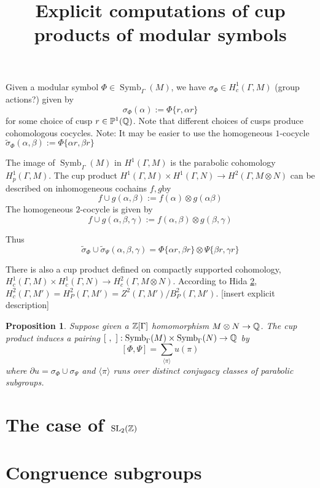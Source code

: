 \documentclass[12pt]{article}
\newtheorem{prop}[thm]{Proposition}
\theoremstyle{definition}
\def\Z{{\Bbb Z}}
\def\Q{{\Bbb Q}}
\def\P{\mathbb{P}}
\def\SL{\operatorname{SL}}
\def\Symb{\operatorname{Symb}}
\def\P{\mathbb{P}}
\begin{document}
\title{Explicit computations of cup products of modular symbols}
\maketitle

Given a modular symbol $\Phi\in\Symb_\Gamma(M)$, we have $\sigma_\Phi \in H^1_c(\Gamma,M)$ (group actions?) given by
$$\sigma_\Phi(\alpha) :=\Phi\{r,\alpha r\}$$
for some choice of cusp $r\in \P^1(\Q)$. Note that different choices of cusps produce cohomologous cocycles.
Note: It may be easier to use the homogeneous $1$-cocycle $\widetilde{\sigma}_{\Phi}(\alpha,\beta):=\Phi\{\alpha r,\beta r\}$

The image of $\Symb_\Gamma(M)$ in $H^1(\Gamma,M)$ is the parabolic cohomology $H^1_p(\Gamma,M)$. The cup product  $H^1(\Gamma,M)\times H^1(\Gamma,N)\rightarrow H^2(\Gamma,M\otimes N)$ can be described on inhomogeneous cochains $f,g$by
$$ f\cup g (\alpha,\beta):=f(\alpha)\otimes g(\alpha\beta)$$
The homogeneous $2$-cocycle is given by
$$ f\cup g (\alpha,\beta,\gamma):=f(\alpha,\beta) \otimes g(\beta,\gamma)$$

Thus
$$\widetilde{\sigma}_\Phi \cup \widetilde{\sigma}_\Psi(\alpha,\beta,\gamma)= \Phi\{\alpha r,\beta r\}\otimes\Psi\{\beta r,\gamma r\}$$

There is also a cup product defined on compactly supported cohomology, $H^1_c(\Gamma,M)\times H^1_c(\Gamma,N)\rightarrow H^2_c(\Gamma,M\otimes N)$. According to Hida \ref{}, $H^2_c(\Gamma, M')=H^2_P(\Gamma,M')=Z^2(\Gamma,M')/B_P^2(\Gamma,M')$. [insert explicit description]

\begin{prop}
Suppose given a $\Z[\Gamma]$ homomorphism $M\otimes N\rightarrow \Q$. The cup product induces a pairing $[~,~] : \Symb_\Gamma(M)\times \Symb_\Gamma(N) \rightarrow \Q$ by
$$[\Phi,\Psi]=\sum_{\langle \pi\rangle } u(\pi)$$
where $\partial u= \sigma_\Phi \cup \sigma_\Psi$ and $\langle \pi\rangle $ runs over distinct conjugacy classes of parabolic subgroups.
\end{prop}

\section{The case of $\SL_2(\Z)$}

\section{Congruence subgroups}
\end{document}
